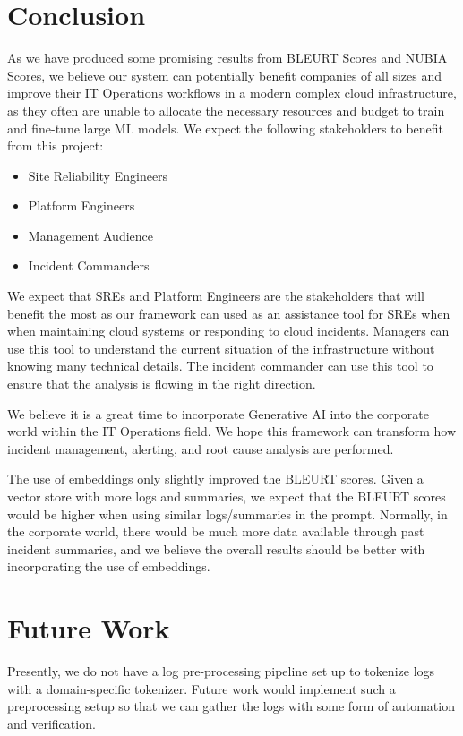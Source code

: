 \documentclass[conference]{IEEEtran}
\begin{document}
\section{Conclusion}

As we have produced some promising results from BLEURT Scores and NUBIA Scores, we believe our system can potentially benefit companies of all sizes and improve their IT Operations workflows in a modern complex cloud infrastructure, as they often are unable to allocate the necessary resources and budget to train and fine-tune large ML models. We expect the following stakeholders to benefit from this project:
\begin{itemize}
    \item Site Reliability Engineers
    \item Platform Engineers 
    \item Management Audience 
    \item Incident Commanders 
\end{itemize}

We expect that SREs and Platform Engineers are the stakeholders that will benefit the most as our framework can used as an assistance tool for SREs when when maintaining cloud systems or responding to cloud incidents. Managers can use this tool to understand the current situation of the infrastructure without knowing many technical details. The incident commander can use this tool to ensure that the analysis is flowing in the right direction. 

We believe it is a great time to incorporate Generative AI into the corporate world within the IT Operations field. We hope this framework can transform how incident management, alerting, and root cause analysis are performed. 

The use of embeddings only slightly improved the BLEURT scores. Given a vector store with more logs and summaries, we expect that the BLEURT scores would be higher when using similar logs/summaries in the prompt. Normally, in the corporate world, there would be much more data available through past incident summaries, and we believe the overall results should be better with incorporating the use of embeddings.

\section{Future Work}

Presently, we do not have a log pre-processing pipeline set up to tokenize logs with a domain-specific tokenizer. Future work would implement such a preprocessing setup so that we can gather the logs with some form of automation and verification.
\end{document}
